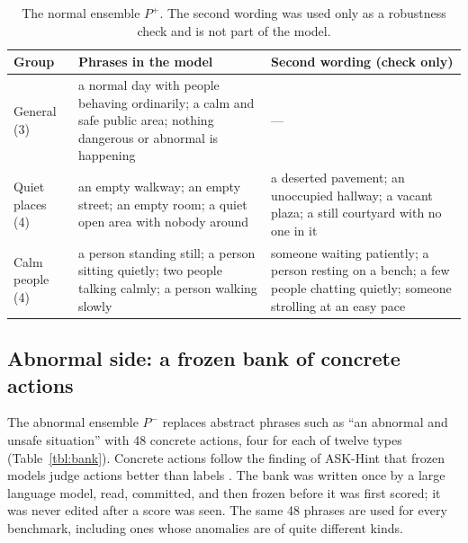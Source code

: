 \documentclass[a4paper,fleqn]{cas-sc}
\begin{document}
\begin{table}[width=\linewidth,cols=3,pos=htbp]
\caption{The normal ensemble $P^{+}$. The second wording was used only as a robustness
check and is not part of the model.}\label{tbl:normal}
\small
\begin{tabularx}{\linewidth}{@{}l Z Z@{}}
\toprule
\textbf{Group} & \textbf{Phrases in the model} & \textbf{Second wording (check only)} \\
\midrule
General (3) & a normal day with people behaving ordinarily; a calm and safe public area; nothing dangerous or abnormal is happening & --- \\
\addlinespace
Quiet places (4) & an empty walkway; an empty street; an empty room; a quiet open area with nobody around & a deserted pavement; an unoccupied hallway; a vacant plaza; a still courtyard with no one in it \\
\addlinespace
Calm people (4) & a person standing still; a person sitting quietly; two people talking calmly; a person walking slowly & someone waiting patiently; a person resting on a bench; a few people chatting quietly; someone strolling at an easy pace \\
\bottomrule
\end{tabularx}
\end{table}

\subsection{Abnormal side: a frozen bank of concrete actions}
The abnormal ensemble $P^{-}$ replaces abstract phrases such as ``an abnormal and
unsafe situation'' with 48 concrete actions, four for each of twelve types
(Table~\ref{tbl:bank}). Concrete actions follow the finding of ASK-Hint that frozen
models judge actions better than labels \citep{zou2026askhint}. The bank was written
once by a large language model, read, committed, and then frozen before it was first
scored; it was never edited after a score was seen. The same 48 phrases are used for
every benchmark, including ones whose anomalies are of quite different kinds.
\end{document}
